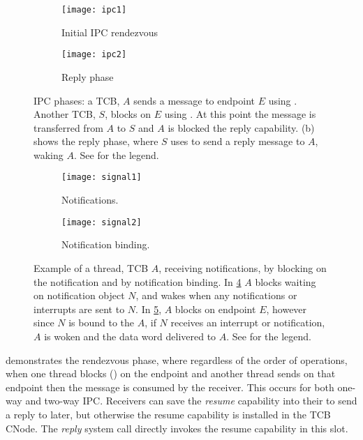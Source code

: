 \begin{figure}
    \centering
    \begin{subfigure}[h]{0.48\textwidth}
        \centering
        \texttt{[image: ipc1]}
        \caption{Initial IPC rendezvous}
        \label{f:ipc1}
    \end{subfigure}%
    \begin{subfigure}[h]{0.48\textwidth}
        \centering
        \texttt{[image: ipc2]}
        \caption{Reply phase}
        \label{f:ipc2}
    \end{subfigure}
    \caption{IPC phases: a TCB, $A$ sends a message to endpoint $E$ using . Another
        TCB, $S$, blocks on $E$ using . At this point the message is transferred from 
        $A$ to $S$ and $A$ is blocked the reply capability. (b) shows the
    reply phase, where $S$ uses  to send a reply message to $A$, waking $A$. See  for the legend.}
    \label{f:ipc}
\end{figure}

\begin{figure}
    \centering
    \begin{subfigure}[h]{0.48\textwidth}
        \centering
        \texttt{[image: signal1]}
        \caption{Notifications.} 
        \label{f:signal1}
    \end{subfigure}%
    \begin{subfigure}[h]{0.48\textwidth}
        \centering
        \texttt{[image: signal2]}
        \caption{Notification binding.}
        \label{f:signal2}
    \end{subfigure}
    \caption{Example of a thread, TCB $A$, receiving notifications, by blocking on the notification and by
        notification binding. In \cref{f:signal1} $A$ blocks waiting on notification
        object $N$, and wakes when any notifications or interrupts are sent to $N$. In
        \cref{f:signal2}, $A$ blocks on endpoint $E$, however since
        $N$ is bound to the $A$, if $N$ receives an interrupt or notification,
        $A$ is woken and the data word delivered to $A$.
        See  for the legend.}
    \label{f:signal}
\end{figure}

 demonstrates the rendezvous phase, where regardless of the order of operations, 
when one thread blocks () on the endpoint and another thread sends on that endpoint
then the message is consumed by the receiver. This occurs for both one-way and two-way \gls{IPC}.
Receivers can save
the \emph{resume} capability into their  to send a reply to later, but otherwise the resume capability is
installed in the \gls{TCB} CNode. The \emph{reply} system call directly invokes the resume
capability in this slot. 

